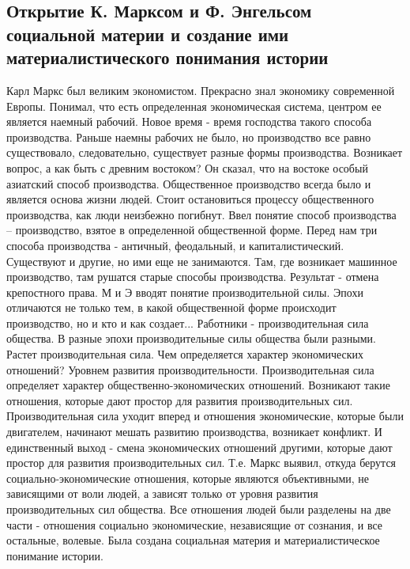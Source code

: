 \subsection{Открытие К. Марксом и Ф. Энгельсом социальной материи и создание ими материалистического понимания истории}

Карл Маркс был великим экономистом. Прекрасно знал экономику современной Европы. Понимал, что есть определенная экономическая система, центром ее является наемный рабочий. Новое время - время господства такого способа производства. Раньше наемны рабочих не было, но производство все равно существовало, следовательно, существует разные формы производства. Возникает вопрос, а как быть с древним востоком? Он сказал, что на востоке особый азиатский способ производства. Общественное производство всегда было и является основа жизни людей. Стоит остановиться процессу общественного производства, как люди неизбежно погибнут. Ввел понятие способ производства – производство, взятое в определенной общественной форме. Перед нам три способа производства - античный, феодальный, и капиталистический. Существуют и другие, но ими еще не занимаются. Там, где возникает машинное производство, там рушатся старые способы производства. Результат - отмена крепостного права. М и Э вводят понятие производительной силы. Эпохи отличаются не только тем, в какой общественной форме происходит производство, но и кто и как создает... Работники - производительная сила общества. В разные эпохи производительные силы общества были разными. Растет производительная сила. Чем определяется характер экономических отношений? Уровнем развития производительности. Производительная сила определяет характер общественно-экономических отношений. Возникают такие отношения, которые дают простор для развития производительных сил. Производительная сила уходит вперед и отношения экономические, которые были двигателем, начинают мешать развитию производства, возникает конфликт. И единственный выход - смена экономических отношений другими, которые дают простор для развития производительных сил. Т.е. Маркс выявил, откуда берутся социально-экономические отношения, которые являются объективными, не зависящими от воли людей, а зависят только от уровня развития производительных сил общества. Все отношения людей были разделены на две части - отношения социально экономические, независящие от сознания, и все остальные, волевые. Была создана социальная материя и материалистическое понимание истории.
